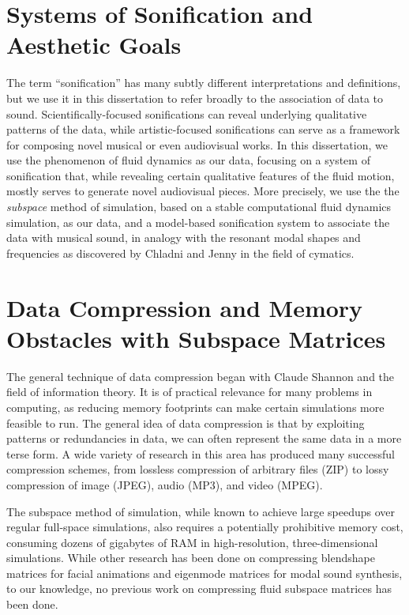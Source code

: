 \section{Systems of Sonification and Aesthetic Goals}
The term ``sonification'' has many subtly different interpretations and definitions, but we use it in this dissertation to refer broadly to the association of data to sound. Scientifically-focused sonifications can reveal underlying
qualitative patterns of the data, while artistic-focused sonifications can serve as a framework for composing novel musical or even audiovisual works. In this dissertation, we use the phenomenon of fluid dynamics as our
data, focusing on a system of sonification that, while revealing certain qualitative features of the fluid motion, mostly serves to generate novel audiovisual pieces. More precisely, we use the the {\em subspace} method of simulation, based on a stable computational fluid dynamics simulation, as our data, and a model-based sonification system to associate the data with musical sound, in analogy with the resonant modal shapes and 
frequencies as discovered by Chladni and Jenny in the field of cymatics.

\section{Data Compression and Memory Obstacles with Subspace Matrices}
The general technique of data compression began with Claude Shannon and the field of information theory. It is of practical relevance for many problems in computing, as reducing memory footprints
can make certain simulations more feasible to run. The general idea of data compression is that by exploiting patterns or redundancies in data, we can often represent the same data in a more terse form.
A wide variety of research in this area has produced many successful compression schemes, from lossless compression of arbitrary files (ZIP) to lossy compression of image (JPEG), audio (MP3), and video (MPEG).

The subspace method of simulation, while known to achieve large speedups over regular full-space simulations, also requires a potentially prohibitive memory cost, consuming dozens of gigabytes of RAM 
in high-resolution, three-dimensional simulations. While other research has been done on compressing blendshape matrices for facial animations and eigenmode matrices for modal sound synthesis,
to our knowledge, no previous work on compressing fluid subspace matrices has been done.

